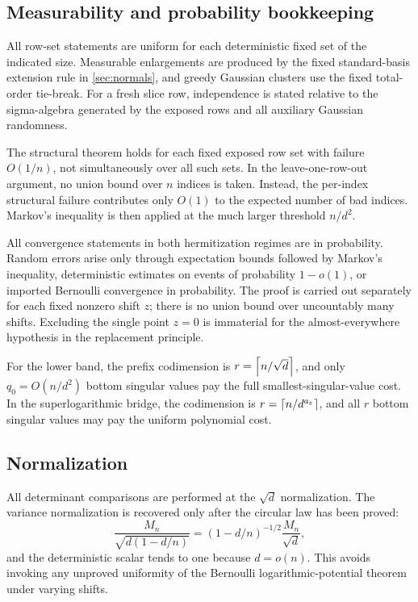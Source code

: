\subsection{Measurability and probability bookkeeping}

All row-set statements are uniform for each deterministic fixed set of the indicated size. Measurable enlargements are produced by the fixed standard-basis extension rule in \cref{sec:normals}, and greedy Gaussian clusters use the fixed total-order tie-break. For a fresh slice row, independence is stated relative to the sigma-algebra generated by the exposed rows and all auxiliary Gaussian randomness.

The structural theorem holds for each fixed exposed row set with failure $O(1/n)$, not simultaneously over all such sets. In the leave-one-row-out argument, no union bound over $n$ indices is taken. Instead, the per-index structural failure contributes only $O(1)$ to the expected number of bad indices. Markov's inequality is then applied at the much larger threshold $n/d^2$.

All convergence statements in both hermitization regimes are in probability. Random errors arise only through expectation bounds followed by Markov's inequality, deterministic estimates on events of probability $1-o(1)$, or imported Bernoulli convergence in probability. The proof is carried out separately for each fixed nonzero shift $z$; there is no union bound over uncountably many shifts. Excluding the single point $z=0$ is immaterial for the almost-everywhere hypothesis in the replacement principle.

For the lower band, the prefix codimension is $r=\left\lceil n/\sqrt d\right\rceil$, and only $q_0=O(n/d^2)$ bottom singular values pay the full smallest-singular-value cost. In the superlogarithmic bridge, the codimension is $r=\left\lceil n/d^{a_\varepsilon}\right\rceil$, and all $r$ bottom singular values may pay the uniform polynomial cost.

\subsection{Normalization}

All determinant comparisons are performed at the $\sqrt d$ normalization. The variance normalization is recovered only after the circular law has been proved:
\[
  \frac{M_n}{\sqrt{d(1-d/n)}}
  =(1-d/n)^{-1/2}\frac{M_n}{\sqrt d},
\]
and the deterministic scalar tends to one because $d=o(n)$. This avoids invoking any unproved uniformity of the Bernoulli logarithmic-potential theorem under varying shifts.

